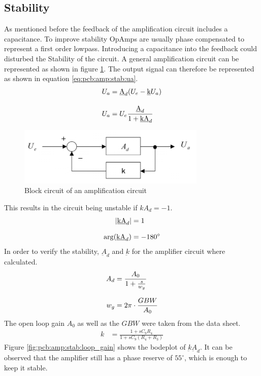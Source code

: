 \subsection{Stability}

As mentioned before the feedback of the amplification circuit includes a capacitance. To improve stability OpAmps are usually phase compensated to represent a first order lowpass. Introducing a capacitance into the feedback could disturbed the Stability of the circuit.
%
A general amplification circuit can be represented as shown in figure \ref{fig:pcb:amp:stab:block}. The output signal can therefore be represented as shown in equation \ref{eq:pcb:amp:stab:ua}.
%
\begin{align}
  U_a &= \underbar{A}_d (U_e - \underbar{k}U_a)\pmath
  U_a &= U_e \cfrac{\underbar{A}_d}{1 + \underbar{k}\underbar{A}_d}\label{eq:pcb:amp:stab:ua}
\end{align}
%
\begin{figure}
  \centering
  \includegraphics[width=0.8\textwidth]{src/assets/pictures/circuit/amp_block_circuit.png}
  \caption{Block circuit of an amplification circuit}\label{fig:pcb:amp:stab:block}
\end{figure}
%
This results in the circuit being unstable if $kA_d = -1$.
%
\begin{align}
  |\underbar{k}\underbar{A}_d| &= 1\pmath
  \arg(\underbar{k}\underbar{A}_d) &= - 180^\circ
\end{align}
%
In order to verify the stability, $\underbar{A}_d$ and $\underbar{k}$ for the amplifier circuit where calculated.
%
\begin{align}
  A_d &= \frac{A_0}{1 + \frac{s}{w_g}}\pmath
  w_g &= 2\pi \cdot \frac{GBW}{A_0}
\end{align}
%
The open loop gain $A_0$ as well as the $GBW$ were taken from the data sheet.\cite{noauthor_tl08xx_2021}
%
\begin{align}
  k &= \frac{1 + s C_9 R_4}{1 + s C_9 (R_4 + R_3)}
\end{align}
%
Figure \ref{fig:pcb:amp:stab:loop_gain} shows the bodeplot of $\underbar{k}\underbar{A}_d$. It can be observed that the amplifier still has a phase reserve of $55^\circ$, which is enough to keep it stable.
